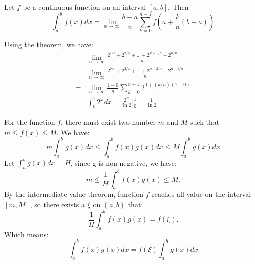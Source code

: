 \begin{numedquestion}
    \begin{thm}Let \(f\) be a continuous function on an interval \([a, b]\). Then
    \[
    \int_{a}^{b} f(x) d x=\lim _{n \rightarrow \infty} \frac{b-a}{n} \sum_{k=0}^{n-1} f\left(a+\frac{k}{n}(b-a)\right)
    \]
    \end{thm}
    Using the theorem, we have:
    \begin{align*}
        &\lim _{n \rightarrow \infty} \frac{2^{1/n} + 2^{2/n} + \dots + 2^{n-1/n} + 2^{n/n}}{n} \\
        =&\lim _{n \rightarrow \infty} \frac{2^{0/n} + 2^{2/n} + \dots + 2^{n-2/n} + 2^{n-1/n}}{n} \\
        =& \lim_{n \rightarrow \infty} \frac{1-0}{n} \sum_{k = 0}^{n-1} 2^{0 + (k/n)(1-0)} \\
        =&  \int_0^1 2^{x} dx = \frac{2^x}{\ln 2} \Big | _0^1 = \frac{1}{\ln 2}
    \end{align*}
\end{numedquestion}
\newpage
\begin{numedquestion}
    For the function $f$, there must exist two number $m$ and $M$ such that $m \leq f(x) \leq M$. We have:
    \[m\int^b_a g(x) dx \leq \int_{a}^{b} f(x) g(x) d x \leq M\int^b_a g(x) dx \]
    Let $\int^b_a g(x) dx = H$, since g is non-negative, we have:
    \[m \leq \frac{1}{H} \int_a^b f(x) g(x) \leq M. \]
    By the intermediate value theorem, function $f$ reaches all value on the interval $[m, M]$, so there exists a $\xi$ on $(a,b)$ that:
    \[\frac{1}{H} \int_a^b f(x) g(x) = f(\xi). \]
    Which means:
    \[\int_{a}^{b} f(x) g(x) d x=f(\xi) \int_{a}^{b} g(x) d x\]

\end{numedquestion}

